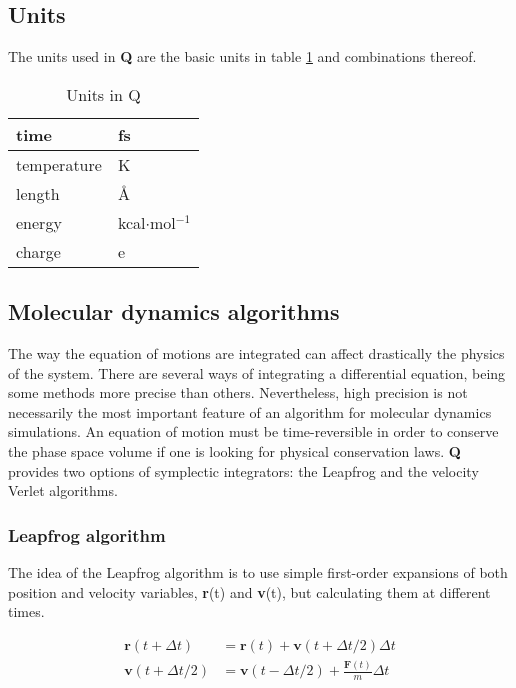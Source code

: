 \documentclass[a4paper,10pt]{article}
\begin{document}
\subsection{Units}
\label{subsec:units}

The units used in \textbf{Q} are the basic units in table \ref{tab:units}
and combinations thereof. \small
\begin{table}[h]
\begin{center}
\caption{Units in Q} \label{tab:units}
\begin{tabular}{|l|l|}
\hline time & fs \\
\hline temperature & K \\
\hline length & \AA \\
\hline energy & kcal$\cdot$mol$^{-1}$ \\
\hline charge & e \\
\hline
\end{tabular}
\end{center}
\end{table} \normalsize

\subsection{Molecular dynamics algorithms}
The way the equation of motions are integrated can affect drastically the 
physics of the system. There are several ways of integrating a differential 
equation, being some methods more precise than others. Nevertheless, 
high precision is not necessarily the most important feature of an algorithm 
for molecular dynamics simulations. An equation of motion must be 
time-reversible in order to conserve the phase space volume if one is looking 
for physical conservation laws. \textbf{Q} provides two options of symplectic 
integrators: the Leapfrog and the velocity Verlet algorithms.

\subsubsection{Leapfrog algorithm}
The idea of the Leapfrog algorithm is to use simple first-order expansions of 
both position and velocity variables, \textbf{r}(t) and \textbf{v}(t), but 
calculating them at different times.

\begin{align}
 \textbf{r}(t+\Delta t) &= \textbf{r}(t) + \textbf{v}(t+\Delta t/2) \Delta t \\
 \textbf{v}(t+\Delta t/2) &= \textbf{v}(t-\Delta t/2) + \frac{\textbf{F}(t)}{m}\Delta t
\end{align}
\end{document}
